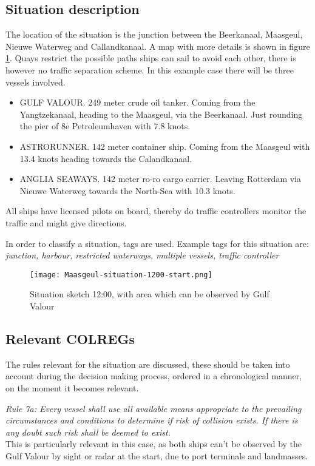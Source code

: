 \subsection{Situation description}
The location of the situation is the junction between the Beerkanaal, Maasgeul, Nieuwe Waterweg and Callandkanaal. A map with more details is shown in figure \ref{fig:Maasgeul-situation-1200}. Quays restrict the possible paths ships can sail to avoid each other, there is however no traffic separation scheme. 
In this example case there will be three vessels involved. 
\begin{itemize}
	\item GULF VALOUR. 249 meter crude oil tanker. Coming from the Yangtzekanaal, heading to the Maasgeul, via the Beerkanaal. Just rounding the pier of 8e Petroleumhaven with 7.8 knots.
	\item ASTRORUNNER. 142 meter container ship. Coming from the Maasgeul with 13.4 knots heading towards the Calandkanaal.
	\item ANGLIA SEAWAYS. 142 meter ro-ro cargo carrier. Leaving Rotterdam via Nieuwe Waterweg towards the North-Sea with 10.3 knots.
\end{itemize}
All ships have licensed pilots on board, thereby do traffic controllers monitor the traffic and might give directions.

In order to classify a situation, tags are used. Example tags for this situation are: 
\emph{junction, harbour, restricted waterways, multiple vessels, traffic controller}

\begin{figure}[H]
	\centering
	\texttt{[image: Maasgeul-situation-1200-start.png]}
	\caption{Situation sketch 12:00, with area which can be observed by Gulf Valour}
	\label{fig:Maasgeul-situation-1200}
\end{figure}


\subsection{Relevant COLREGs}
The rules relevant for the situation are discussed, these should be taken into account during the decision making process, ordered in a chronological manner, on the moment it becomes relevant. 

\emph{Rule 7a: Every vessel shall use all available means appropriate to the prevailing circumstances and conditions to determine if risk of collision exists. If there is any doubt such risk shall be deemed to exist.} \\
This is particularly relevant in this case, as both ships can't be observed by the Gulf Valour by sight or radar at the start, due to port terminals and landmasses. 

